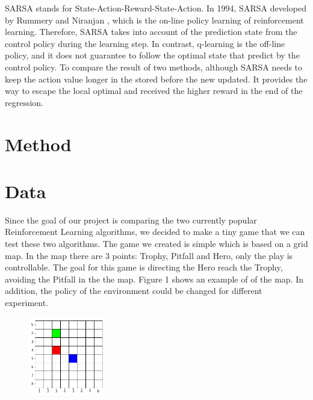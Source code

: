 \documentclass[article]{aaltoseries}
\begin{document}
SARSA stands for State-Action-Reward-State-Action. In 1994, SARSA developed by Rummery and Niranjan \cite{articleonline}, which is the on-line policy learning of reinforcement learning. Therefore, SARSA takes into account of the prediction state from the control policy during the learning step. In contrast, q-learning is the off-line policy, and it does not guarantee to follow the optimal state that predict by the control policy. To compare the result of two methods, although SARSA needs to keep the action value longer in the stored before the new updated. It provides the way to escape the local optimal and received the higher reward in the end of the regression.





\section{Method}





\section{Data}

Since the goal of our project is comparing the two currently popular Reinforcement Learning algorithms, we decided to make a tiny game that we can test these two algorithms. The game we created is simple which is based on a grid map. In the map there are 3 points: Trophy, Pitfall and Hero, only the play is controllable. The goal for this game is directing the Hero reach the Trophy, avoiding the Pitfall in the the map. Figure 1 shows an example of of the map. In addition, the policy of the environment could be changed for different experiment.

\begin{figure}[t!]
  \begin{center}
    \includegraphics[width=0.3\textwidth]{figures/grid_drew}
    \caption{}
    \label{fig:mypicture1}
  \end{center}
\end{figure}
\end{document}

